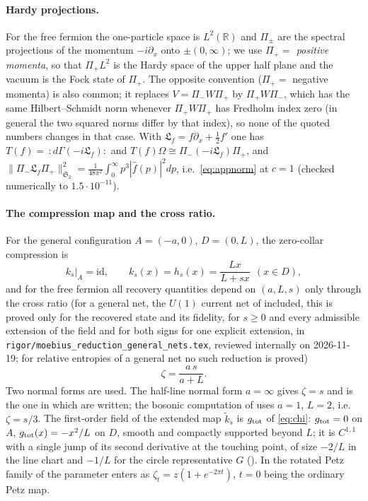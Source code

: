 \paragraph{Hardy projections.}  For the free fermion the one-particle space is $L^{2}(\mathbb R)$ and
$\Pi_{\pm}$ are the spectral projections of the momentum $-i\partial_{x}$ onto $\pm(0,\infty)$; we use
\emph{$\Pi_{+}=$ positive momenta}, so that $\Pi_{+}L^{2}$ is the Hardy space of the upper half plane and
the vacuum is the Fock state of $\Pi_{+}$.  The opposite convention ($\Pi_{+}=$ negative momenta) is also
common; it replaces $V=\Pi_{-}W\Pi_{+}$ by $\Pi_{+}W\Pi_{-}$, which has the same Hilbert--Schmidt norm whenever $\Pi_{+}W\Pi_{+}$ has Fredholm index zero (in general the two squared norms differ by that index), so
none of the quoted numbers changes in that case.  With $\mathfrak L_{f}=f\partial_{x}+\frac12f'$ one has
$T(f)=\,:\!d\Gamma(-i\mathfrak L_{f})\!:$ and $T(f)\Omega\cong\Pi_{-}(-i\mathfrak L_{f})\Pi_{+}$, and
$\|\Pi_{-}\mathfrak L_{f}\Pi_{+}\|_{\mathfrak S_{2}}^{2}=\frac{1}{48\pi^{2}}\int_{0}^{\infty}
p^{3}|\hat f(p)|^{2}dp$, i.e.\ \eqref{eq:appnorm} at $c=1$ (checked numerically to $1.5\cdot10^{-11}$).

\paragraph{The compression map and the cross ratio.}  For the general configuration $A=(-a,0)$,
$D=(0,L)$, the zero-collar compression is
\begin{equation}\label{eq:appks}
 k_{s}|_{A}=\mathrm{id},\qquad k_{s}(x)=h_{s}(x)=\frac{Lx}{L+sx}\ \ (x\in D),
\end{equation}
and for the free fermion all recovery quantities depend on $(a,L,s)$ only through the cross ratio (for a
general net, the $U(1)$ current net of  included, this is proved only for the recovered state
and its fidelity, for $s\ge0$ and every admissible extension of the field and for both signs for one explicit
extension, in \texttt{rigor/moebius\_reduction\_general\_nets.tex}, reviewed internally on 2026-11-19; for
relative entropies of a general net no such reduction is proved)
\begin{equation}\label{eq:appzeta}
 \zeta=\frac{a\,s}{a+L}.
\end{equation}
Two normal forms are used.  The half-line normal form $a=\infty$ gives $\zeta=s$ and is the one in which
 are written; the bosonic computation of  uses $a=1$, $L=2$, i.e.\
$\zeta=s/3$.  The first-order field of the extended map $\tilde k_{s}$ is $g_{\rm tot}$ of \eqref{eq:chi}:
$g_{\rm tot}=0$ on $A$, $g_{\rm tot}(x)=-x^{2}/L$ on $D$, smooth and compactly supported beyond $L$; it is
$C^{1,1}$ with a single jump of its second derivative at the touching point, of size $-2/L$ in the line
chart and $-1/L$ for the circle representative $G$ (\Cref{thm:reg}).  In the rotated Petz family
of \cite{FHSW} the parameter enters as $\zeta_{t}=z(1+e^{-2\pi t})$, $t=0$ being the ordinary Petz map.

